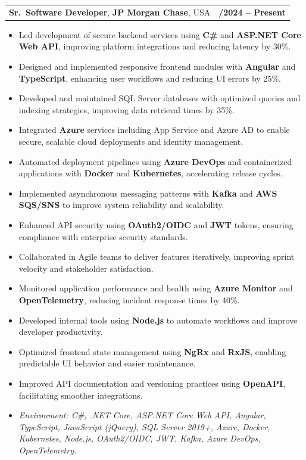 \documentclass[letterpaper,11pt]{article}
\makeatletter
\newcommand{\resumeItem}[1]{
  \item\footnotesize{
    {#1 \vspace{-2pt}}
  }
}
\newcommand{\resumeSubheading}[4]{
  \vspace{-2pt}\item
    \begin{tabular*}{1.0\textwidth}[t]{l@{\extracolsep{\fill}}r}
      \textbf{\fontsize{10pt}{14pt}\selectfont #3}, \textbf{\fontsize{10pt}{14pt}\selectfont #1}, \fontsize{10pt}{14pt}\selectfont #4 & \textbf{\fontsize{10pt}{14pt}\selectfont #2} \\
    \end{tabular*}\vspace{-7pt}
}
\newcommand{\resumeItemListStart}{\begin{itemize}[leftmargin=*]}
\newcommand{\resumeItemListEnd}{\end{itemize}\vspace{-5pt}}
\makeatother
\begin{document}
\resumeSubheading
{JP Morgan Chase}{09/2024 -- Present}
{Sr.\ Software Developer}{USA}
\resumeItemListStart
  \resumeItem{Led development of secure backend services using \textbf{C\#} and \textbf{ASP.NET Core Web API}, improving platform integrations and reducing latency by 30\%.}
  \resumeItem{Designed and implemented responsive frontend modules with \textbf{Angular} and \textbf{TypeScript}, enhancing user workflows and reducing UI errors by 25\%.}
  \resumeItem{Developed and maintained SQL Server databases with optimized queries and indexing strategies, improving data retrieval times by 35\%.}
  \resumeItem{Integrated \textbf{Azure} services including App Service and Azure AD to enable secure, scalable cloud deployments and identity management.}
  \resumeItem{Automated deployment pipelines using \textbf{Azure DevOps} and containerized applications with \textbf{Docker} and \textbf{Kubernetes}, accelerating release cycles.}
  \resumeItem{Implemented asynchronous messaging patterns with \textbf{Kafka} and \textbf{AWS SQS/SNS} to improve system reliability and scalability.}
  \resumeItem{Enhanced API security using \textbf{OAuth2/OIDC} and \textbf{JWT} tokens, ensuring compliance with enterprise security standards.}
  \resumeItem{Collaborated in Agile teams to deliver features iteratively, improving sprint velocity and stakeholder satisfaction.}
  \resumeItem{Monitored application performance and health using \textbf{Azure Monitor} and \textbf{OpenTelemetry}, reducing incident response times by 40\%.}
  \resumeItem{Developed internal tools using \textbf{Node.js} to automate workflows and improve developer productivity.}
  \resumeItem{Optimized frontend state management using \textbf{NgRx} and \textbf{RxJS}, enabling predictable UI behavior and easier maintenance.}
  \resumeItem{Improved API documentation and versioning practices using \textbf{OpenAPI}, facilitating smoother integrations.}
  \resumeItem{\textit{Environment: C\#, .NET Core, ASP.NET Core Web API, Angular, TypeScript, JavaScript (jQuery), SQL Server 2019+, Azure, Docker, Kubernetes, Node.js, OAuth2/OIDC, JWT, Kafka, Azure DevOps, OpenTelemetry.}}
\resumeItemListEnd
\end{document}
